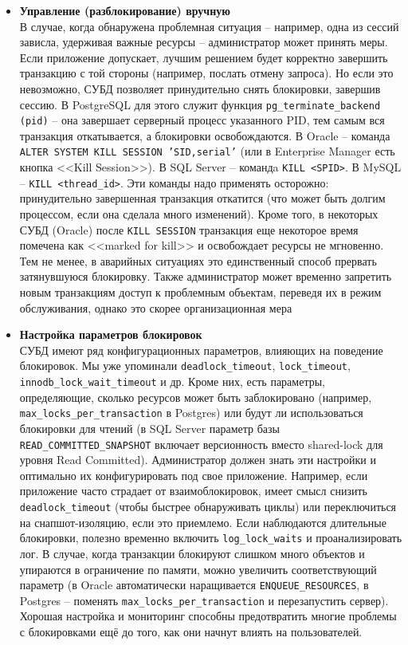 \begin{itemize}
    \item \textbf{Управление (разблокирование) вручную} ~\\
   В случае, когда обнаружена проблемная ситуация – например, одна из сессий зависла, удерживая важные ресурсы – администратор может принять меры. Если приложение допускает, лучшим решением будет корректно завершить транзакцию с той стороны (например, послать отмену запроса). Но если это невозможно, СУБД позволяет принудительно снять блокировки, завершив сессию. В PostgreSQL для этого служит функция \texttt{pg\_terminate\_backend (pid)} – она завершает серверный процесс указанного PID, тем самым вся транзакция откатывается, а блокировки освобождаются. В Oracle – команда \texttt{ALTER SYSTEM KILL SESSION 'SID,serial'} (или в Enterprise Manager есть кнопка <<Kill Session>>). В SQL Server – командa \texttt{KILL <SPID>}. В MySQL – \texttt{KILL <thread\_id>}. Эти команды надо применять осторожно: принудительно завершенная транзакция откатится (что может быть долгим процессом, если она сделала много изменений). Кроме того, в некоторых СУБД (Oracle) после \texttt{KILL SESSION} транзакция еще некоторое время помечена как <<marked for kill>> и освобождает ресурсы не мгновенно. Тем не менее, в аварийных ситуациях это единственный способ прервать затянувшуюся блокировку. Также администратор может временно запретить новым транзакциям доступ к проблемным объектам, переведя их в режим обслуживания, однако это скорее организационная мера
    \item \textbf{Настройка параметров блокировок} ~\\
    СУБД имеют ряд конфигурационных параметров, влияющих на поведение блокировок. Мы уже упоминали \texttt{deadlock\_timeout}, \texttt{lock\_timeout}, \texttt{innodb\_lock\_wait\_timeout} и др. Кроме них, есть параметры, определяющие, сколько ресурсов может быть заблокировано (например, \texttt{max\_locks\_per\_transaction} в Postgres) или будут ли использоваться блокировки для чтений (в SQL Server параметр базы \texttt{READ\_COMMITTED\_SNAPSHOT} включает версионность вместо shared-lock для уровня Read Committed). Администратор должен знать эти настройки и оптимально их конфигурировать под свое приложение. Например, если приложение часто страдает от взаимоблокировок, имеет смысл снизить \texttt{deadlock\_timeout} (чтобы быстрее обнаруживать циклы) или переключиться на снапшот-изоляцию, если это приемлемо. Если наблюдаются длительные блокировки, полезно временно включить \texttt{log\_lock\_waits} и проанализировать лог. В случае, когда транзакции блокируют слишком много объектов и упираются в ограничение по памяти, можно увеличить соответствующий параметр (в Oracle автоматически наращивается \texttt{ENQUEUE\_RESOURCES}, в Postgres – поменять \texttt{max\_locks\_per\_transaction} и перезапустить сервер). Хорошая настройка и мониторинг способны предотвратить многие проблемы с блокировками ещё до того, как они начнут влиять на пользователей.
 \end{itemize} 

